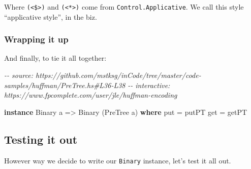 \documentclass[]{article}
\newenvironment{Shaded}{}{}
\newcommand{\CommentTok}[1]{\textcolor[rgb]{0.38,0.63,0.69}{\textit{#1}}}
\newcommand{\DataTypeTok}[1]{\textcolor[rgb]{0.56,0.13,0.00}{#1}}
\newcommand{\KeywordTok}[1]{\textcolor[rgb]{0.00,0.44,0.13}{\textbf{#1}}}
\newcommand{\NormalTok}[1]{#1}
\newcommand{\OtherTok}[1]{\textcolor[rgb]{0.00,0.44,0.13}{#1}}
\begin{document}
Where \texttt{(\textless{}\$\textgreater{})} and
\texttt{(\textless{}*\textgreater{})} come from \texttt{Control.Applicative}. We
call this style ``applicative style'', in the biz.

\hypertarget{wrapping-it-up}{%
\subsubsection{Wrapping it up}\label{wrapping-it-up}}

And finally, to tie it all together:

\begin{Shaded}
\begin{Highlighting}[]
\CommentTok{{-}{-} source: https://github.com/mstksg/inCode/tree/master/code{-}samples/huffman/PreTree.hs\#L36{-}L38}
\CommentTok{{-}{-} interactive: https://www.fpcomplete.com/user/jle/huffman{-}encoding}

\KeywordTok{instance} \DataTypeTok{Binary}\NormalTok{ a }\OtherTok{=>} \DataTypeTok{Binary}\NormalTok{ (}\DataTypeTok{PreTree}\NormalTok{ a) }\KeywordTok{where}
\NormalTok{    put }\OtherTok{=}\NormalTok{ putPT}
\NormalTok{    get }\OtherTok{=}\NormalTok{ getPT}
\end{Highlighting}
\end{Shaded}

\hypertarget{testing-it-out}{%
\subsection{Testing it out}\label{testing-it-out}}

However way we decide to write our \texttt{Binary} instance, let's test it all
out.
\end{document}

